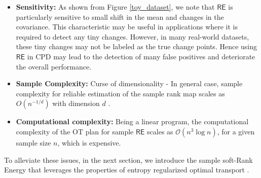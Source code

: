 \documentclass{article}
\begin{document}

\vspace{-3mm}
\begin{itemize}[leftmargin=*]
\setlength {\itemsep}{-4pt} 

    \item \textbf{Sensitivity:} As shown from Figure \ref{toy_dataset}, we note that {\small $\mathsf{RE}$} is particularly sensitive to small shift in the mean and changes in the covariance. This characteristic may be useful in applications where it is required to detect any tiny changes. However, in many real-world datasets, these tiny changes may not be labeled as the true change points. Hence using {\small $\mathsf{RE}$} in CPD may lead to the detection of many false positives and deteriorate the overall performance.

    \item \textbf{Sample Complexity:} Curse of dimensionality -  In general case, sample complexity for reliable estimation of the sample rank map scales as $O(n^{-1/d})$ with dimension $d$ \cite{genevay2019sample}.
    
    \item \textbf{Computational complexity:} Being a linear program, the computational complexity of the OT plan for sample $\mathsf{RE}$ scales as $\mathcal O(n^3\log n)$, for a given sample size $n$, which is expensive.
\end{itemize}
\vspace{-2mm}
To alleviate these issues, in the next section, we introduce the sample soft-Rank Energy that leverages the properties of entropy regularized optimal transport \cite{peyre2019computational}.
\end{document}
